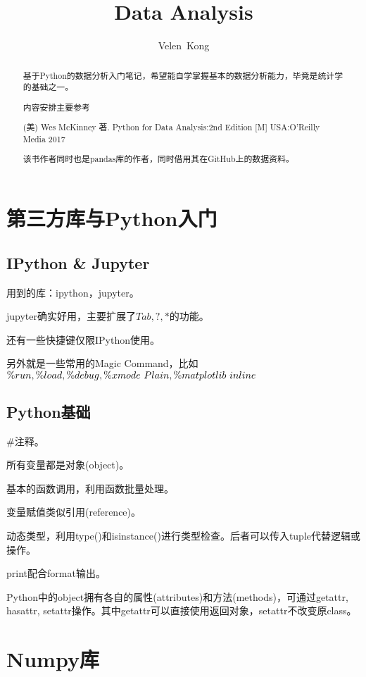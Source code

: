 \documentclass[UTF8]{ctexart}
\begin{document}
\pagestyle{headings}
\title{Data Analysis}
\author{Velen~Kong
}
\maketitle
\begin{abstract}

基于Python的数据分析入门笔记，希望能自学掌握基本的数据分析能力，毕竟是统计学的基础之一。

内容安排主要参考

(美) Wes McKinney 著. Python for Data Analysis:2nd Edition [M] USA:O'Reilly Media 2017

该书作者同时也是pandas库的作者，同时借用其在GitHub上的数据资料。

\end{abstract}

\section{第三方库与Python入门}

\subsection{IPython \& Jupyter}

用到的库：ipython，jupyter。

jupyter确实好用，主要扩展了$Tab,?,*$的功能。

还有一些快捷键仅限IPython使用。

另外就是一些常用的Magic Command，比如$\%run, \%load, \\
\%debug, \%xmode~Plain, \%matplotlib~inline$

\subsection{Python基础}

\#注释。

所有变量都是对象(object)。

基本的函数调用，利用函数批量处理。

变量赋值类似引用(reference)。

动态类型，利用type()和isinstance()进行类型检查。后者可以传入tuple代替逻辑或操作。

print配合format输出。

Python中的object拥有各自的属性(attributes)和方法(methods)，可通过getattr, hasattr, setattr操作。其中getattr可以直接使用返回对象，setattr不改变原class。





\section{Numpy库}
\end{document}
